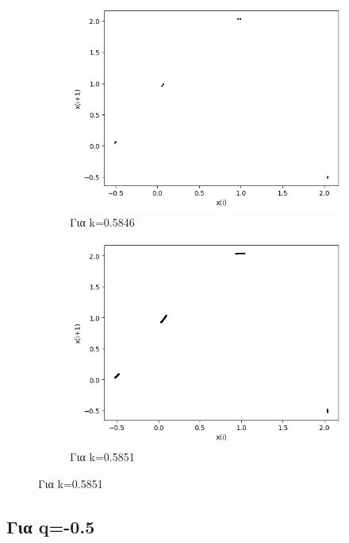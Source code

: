 \begin{figure}[h!]
\begin{subfigure}[b]{0.25\textwidth}
		\includegraphics[width=\textwidth]{LateX images/graphs q03/g13}
		\caption{Για k=0.5846}
		\label{f:k25}
	\end{subfigure}
	\hfill
	\begin{subfigure}[b]{0.25\textwidth}
		\centering
		\includegraphics[width=\textwidth]{LateX images/graphs q03/g14}
		\caption{Για k=0.5851}
		\label{f:k26}
	\end{subfigure}
	
\end{figure}

\clearpage

\subsection{Για q=-0.5}

